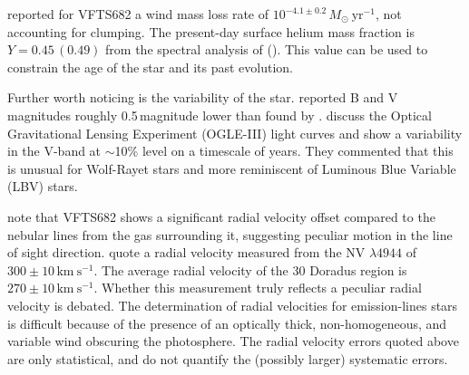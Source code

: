 \documentclass[apjl,twocolumn]{emulateapj}
\newcommand{\SdM}[1]{{{\color{brown}{#1}}}}
\newcommand{\kms}{{\,\mathrm{km\ s^{-1}}}}
\newcommand{\Msun}{{\,\mathrm{M}_\odot}}
\begin{document}
\citet{bestenlehner:11} reported for VFTS682 a wind mass loss rate of
$10^{-4.1\pm0.2}\,M_\odot \ \mathrm{yr}^{-1}$, %
not accounting for
clumping. The present-day surface helium mass
fraction is $Y=0.45\, (0.49)$ from the spectral analysis of
\cite{bestenlehner:11} (\citealt{rubio-diez:17}). This value can be
used to constrain the age of the star and its past evolution.


Further worth noticing is the variability of the
star. \citet{parker:93} reported B and V magnitudes roughly 0.5\,magnitude
lower than found by \citet{evans:11}.
\citet{bestenlehner:11} discuss the Optical Gravitational Lensing
Experiment (OGLE-III) light curves \citep{udalski:08} and show a
variability in the V-band at $\sim$10\% level on a timescale of years.
They commented that this is unusual for Wolf-Rayet stars and more reminiscent
of Luminous Blue Variable (LBV) stars. %

\cite{bressert:12} note that VFTS682 shows a significant radial velocity offset compared to the nebular lines from the gas surrounding it, suggesting peculiar motion in the line of sight direction.  \citet[ ][]{bestenlehner:11} quote a radial velocity measured from the NV $\lambda4944$ of   $300\pm10\kms$. The average radial velocity of the 30 Doradus region is 
$270\pm10\kms$. Whether this measurement truly reflects a peculiar radial velocity is debated. The determination of radial velocities for emission-lines stars is difficult because of the presence of an optically thick, non-homogeneous, and variable wind obscuring the photosphere. The radial velocity errors quoted above are only statistical, and do not quantify the (possibly larger)
systematic errors.  \SdM{TODO: Possibly mention and cite paper in prep by Paco and student on Xshooter data?  Possibly mention (or even use) on their measurement for the RV?}

\end{document}
